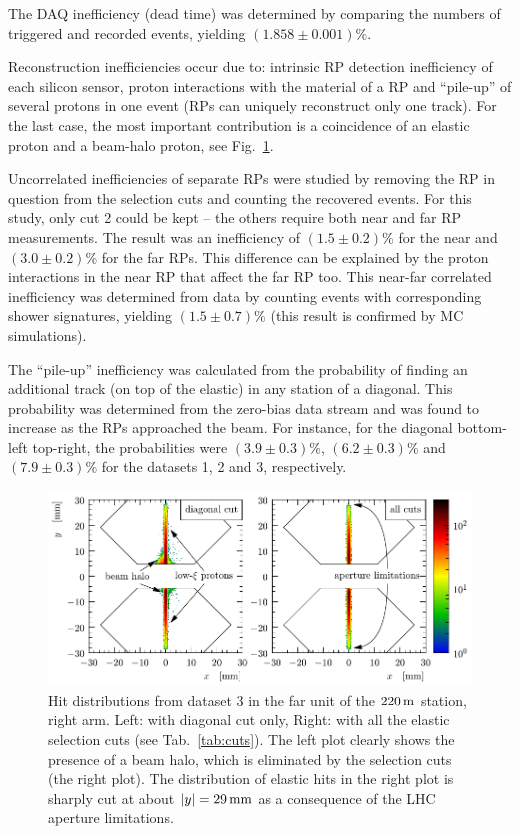 \documentclass[doublecol]{epl/epl2}
\def\un#1{\,{\rm #1}}
\begin{document}
The DAQ inefficiency (dead time) was determined by comparing the numbers of triggered and recorded events, yielding $(1.858 \pm 0.001)\%$.

Reconstruction inefficiencies occur due to: intrinsic RP detection inefficiency of each silicon sensor, proton interactions with the material of a RP and ``pile-up'' of several protons in one event (RPs can uniquely reconstruct only one track). For the last case, the most important contribution is a coincidence of an elastic proton and a beam-halo proton, see Fig.~\ref{fig:hit dist}.

Uncorrelated inefficiencies of separate RPs were studied by removing the RP in question from the selection cuts and counting the recovered events. For this study, only cut 2 could be kept -- the others require both near and far RP measurements. The result was an inefficiency of $(1.5 \pm 0.2)\%$ for the near and $(3.0 \pm 0.2)\%$ for the far RPs. This difference can be explained by the proton interactions in the near RP that affect the far RP too. This near-far correlated inefficiency was determined from data by counting events with corresponding shower signatures, yielding $(1.5\pm 0.7)\%$ (this result is confirmed by MC simulations).

The ``pile-up'' inefficiency was calculated from the probability of finding an additional track (on top of the elastic) in any station of a diagonal. This probability was determined from the zero-bias data stream and was found to increase as the RPs approached the beam. For instance, for the diagonal bottom-left top-right, the probabilities were $(3.9 \pm 0.3)\%$, $(6.2 \pm 0.3)\%$ and $(7.9 \pm 0.3)\%$ for the datasets 1, 2 and 3, respectively.


\begin{figure}
\hbox{}\vskip-7mm
\begin{center}
\includegraphics{fig/hit_dist.pdf}
\vskip-5mm
\caption{Hit distributions from dataset 3 in the far unit of the $220\un{m}$ station, right arm. Left: with diagonal cut only, Right: with all the elastic selection cuts (see Tab.~\ref{tab:cuts}). The left plot clearly shows the presence of a beam halo, which is eliminated by the selection cuts (the right plot). The distribution of elastic hits in the right plot is sharply cut at about $|y| = 29\un{mm}$ as a consequence of the LHC aperture limitations. }
\label{fig:hit dist}
\end{center}
\end{figure}
\end{document}
